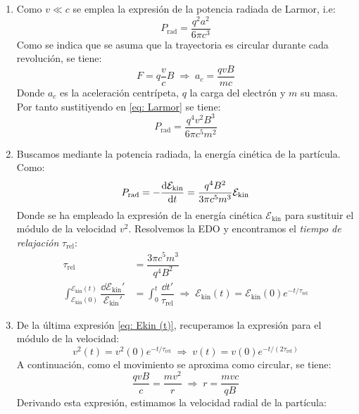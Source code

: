 \documentclass[11pt]{article}
\newcommand{\Prad}{P_\textrm{rad}}
\newcommand{\Ekin}{\mathcal{E}_\textrm{kin}}
\newcommand{\trel}{\tau_\textrm{rel}}
\begin{document}
\begin{enumerate}[label=\roman*{})]
    \item Como $v\ll c$ se emplea la expresión de la potencia radiada de Larmor, i.e:
    \begin{equation}
        P_\textrm{rad} = \dfrac{q^2 a^2}{6\pi c^3}\label{eq: Larmor}
    \end{equation}
    Como se indica que se asuma que la trayectoria es circular durante cada revolución, se tiene: 
    \begin{equation}
        F = q\dfrac{v}{c}B \;\Rightarrow\; a_c = \dfrac{qvB}{mc} 
    \end{equation}
    Donde $a_c$ es la aceleración centrípeta, $q$ la carga del electrón y $m$ su masa. Por tanto sustitiyendo en \eqref{eq: Larmor} se tiene: 
    \begin{equation}
        \Prad = \dfrac{q^4 v^2 B^3}{6\pi c^5m^2}
    \end{equation}
    \item Buscamos mediante la potencia radiada, la energía cinética de la partícula. Como: 
    \begin{equation}
        \Prad = -\dv{\Ekin}{t} = \dfrac{q^4 B^2}{3\pi c^5 m ^3}\Ekin
    \end{equation}
    Donde se ha empleado la expresión de la energía cinética $\Ekin$ para sustituir el módulo de la velocidad $v^2$. Resolvemos la EDO y encontramos el \textit{tiempo de relajación} $\trel$: 
    \begin{align}   
        \trel &= \dfrac{3\pi c^5 m^3 }{q^4 B^2}\\ 
        \int_{\Ekin(0)}^{\Ekin(t)}\dfrac{\dd{\Ekin '}}{\Ekin '} &= \int_{0}^{t}\dfrac{\dd{t'}}{\trel} \;\Rightarrow\; \Ekin(t) = \Ekin(0)e^{-t/\trel}\label{eq: Ekin (t)}
    \end{align}
    \item De la última expresión \eqref{eq: Ekin (t)}, recuperamos la expresión para el módulo de la velocidad: 
    \begin{equation}
        v^2(t) = v^2(0)e^{-t/\trel} \;\Rightarrow\; v(t) = v(0)e^{-t/(2\trel)}
    \end{equation}  
    A continuación, como el movimiento se aproxima como circular, se tiene: 
    \begin{equation}
        \dfrac{qvB}{c} = \dfrac{mv^2}{r} \;\Rightarrow\; r = \dfrac{mvc}{qB}
    \end{equation}
    Derivando esta expresión, estimamos la velocidad radial de la partícula: 
    \begin{equation}

\end{equation}
\end{enumerate}
\end{document}
